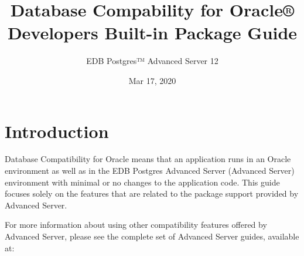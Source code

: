 \documentclass[letterpaper,10pt,english,openany,oneside]{sphinxmanual}
\title{Database Compability for Oracle® Developers Built-in Package Guide}
\date{Mar 17, 2020}
\author{EDB Postgres™ Advanced Server 12}
\begin{document}
\maketitle
\sphinxtableofcontents
{}\label{\detokenize{index::doc}}



\chapter{Introduction}
\label{\detokenize{introduction:database-compatibility-for-oracle-developers-built-in-packages-guide}}\label{\detokenize{introduction::doc}}\label{\detokenize{introduction:introduction}}
Database Compatibility for Oracle means that an application runs in an
Oracle environment as well as in the EDB Postgres Advanced Server
(Advanced Server) environment with minimal or no changes to the
application code. This guide focuses solely on the features that are
related to the package support provided by Advanced Server.

For more information about using other compatibility features offered by
Advanced Server, please see the complete set of Advanced Server guides,
available at:


\newpage
\end{document}
